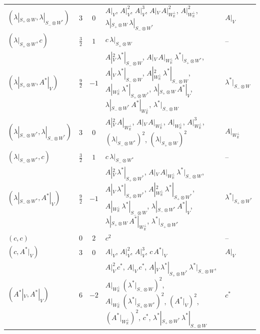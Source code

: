 \begin{tabular}{l|c|c|l|l}
$(\lambda|_{S_+\otimes W},\lambda|_{S_-\otimes W^*})$ & $3$ & $0$ & $A|_V$, $A|_V^2$, $A|_V^3$, $A|_V\,A|_{W_{\mathbb R}^\perp}^2$, $A|_{W_{\mathbb R}^\perp}^2$, $\lambda|_{S_+\otimes W}\,\lambda|_{S_-\otimes W^*}$ & $A|_V$\\
$(\lambda|_{S_+\otimes W},c)$ & $\tfrac{3}{2}$ & $1$ & $c\,\lambda|_{S_+\otimes W}$ & --\\
$(\lambda|_{S_+\otimes W},A^*|_V)$ & $\tfrac{9}{2}$ & $-1$ & $A|_V^2\,\lambda^*|_{S_-\otimes W}$, $A|_V\,A|_{W_{\mathbb R}^\perp}\,\lambda^*|_{S_+\otimes W^*}$, $A|_V\,\lambda^*|_{S_-\otimes W}$, $A|_{W_{\mathbb R}^\perp}^2\,\lambda^*|_{S_-\otimes W}$, $A|_{W_{\mathbb R}^\perp}\,\lambda^*|_{S_+\otimes W^*}$, $\lambda|_{S_+\otimes W}\,A^*|_V$, $\lambda|_{S_-\otimes W^*}\,A^*|_{W_{\mathbb R}^\perp}$, $\lambda^*|_{S_-\otimes W}$ & $\lambda^*|_{S_-\otimes W}$\\
$(\lambda|_{S_-\otimes W^*},\lambda|_{S_-\otimes W^*})$ & $3$ & $0$ & $A|_V^2\,A|_{W_{\mathbb R}^\perp}$, $A|_V\,A|_{W_{\mathbb R}^\perp}$, $A|_{W_{\mathbb R}^\perp}$, $A|_{W_{\mathbb R}^\perp}^3$, $(\lambda|_{S_-\otimes W^*})^2$, $(\lambda|_{S_+\otimes W})^2$ & $A|_{W_{\mathbb R}^\perp}$\\
$(\lambda|_{S_-\otimes W^*},c)$ & $\tfrac{3}{2}$ & $1$ & $c\,\lambda|_{S_-\otimes W^*}$ & --\\
$(\lambda|_{S_-\otimes W^*},A^*|_V)$ & $\tfrac{9}{2}$ & $-1$ & $A|_V^2\,\lambda^*|_{S_+\otimes W^*}$, $A|_V\,A|_{W_{\mathbb R}^\perp}\,\lambda^*|_{S_-\otimes W}$, $A|_V\,\lambda^*|_{S_+\otimes W^*}$, $A|_{W_{\mathbb R}^\perp}^2\,\lambda^*|_{S_+\otimes W^*}$, $A|_{W_{\mathbb R}^\perp}\,\lambda^*|_{S_-\otimes W}$, $\lambda|_{S_-\otimes W^*}\,A^*|_V$, $\lambda|_{S_+\otimes W}\,A^*|_{W_{\mathbb R}^\perp}$, $\lambda^*|_{S_+\otimes W^*}$ & $\lambda^*|_{S_+\otimes W^*}$\\
$(c,c)$ & $0$ & $2$ & $c^2$ & --\\
$(c,A^*|_V)$ & $3$ & $0$ & $A|_V$, $A|_V^2$, $A|_V^3$, $c\,A^*|_V$ & $A|_V$\\
$(A^*|_V,A^*|_V)$ & $6$ & $-2$ & $A|_V^2\,c^*$, $A|_V\,c^*$, $A|_V\,\lambda^*|_{S_+\otimes W^*}\,\lambda^*|_{S_-\otimes W}$, $A|_{W_{\mathbb R}^\perp}\,(\lambda^*|_{S_-\otimes W})^2$, $A|_{W_{\mathbb R}^\perp}\,(\lambda^*|_{S_+\otimes W^*})^2$, $(A^*|_V)^2$, $(A^*|_{W_{\mathbb R}^\perp})^2$, $c^*$, $\lambda^*|_{S_+\otimes W^*}\,\lambda^*|_{S_-\otimes W}$ & $c^*$\\
\end{tabular}

